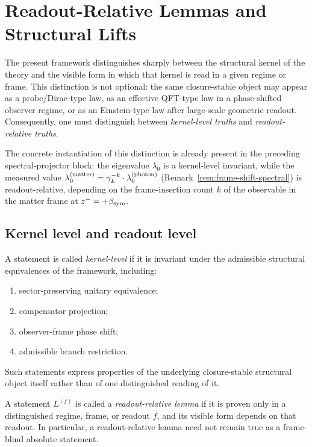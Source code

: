 \section{Readout-Relative Lemmas and Structural Lifts}
\label{sec:readout-relative-lemmas}

The present framework distinguishes sharply between the structural kernel
of the theory and the visible form in which that kernel is read in a
given regime or frame. This distinction is not optional: the same
closure-stable object may appear as a probe/Dirac-type law, as an
effective QFT-type law in a phase-shifted observer regime, or as an
Einstein-type law after large-scale geometric readout. Consequently,
one must distinguish between \emph{kernel-level truths} and
\emph{readout-relative truths}.

The concrete instantiation of this distinction is already present in the
preceding spectral-projector block: the eigenvalue $\lambda_0$ is a
kernel-level invariant, while the measured value
$\lambda_0^{(\mathrm{matter})} = \gamma_L^{-k}\cdot\lambda_0^{(\mathrm{photon})}$
(Remark~\ref{rem:frame-shift-spectral}) is readout-relative, depending
on the frame-insertion count $k$ of the observable in the matter frame
at $z^- = +\beta_{\mathrm{sym}}$.

\subsection*{Kernel level and readout level}

\begin{definition}
\label{def:kernel-level-statement}
A statement is called \emph{kernel-level} if it is invariant under the
admissible structural equivalences of the framework, including:
\begin{enumerate}[label=(\roman*)]
  \item sector-preserving unitary equivalence;
  \item compensator projection;
  \item observer-frame phase shift;
  \item admissible branch restriction.
\end{enumerate}
Such statements express properties of the underlying closure-stable
structural object itself rather than of one distinguished reading of it.
\end{definition}

\begin{definition}
\label{def:readout-relative-lemma}
A statement $L^{(f)}$ is called a \emph{readout-relative lemma} if it
is proven only in a distinguished regime, frame, or readout $f$, and its
visible form depends on that readout. In particular, a readout-relative
lemma need not remain true as a frame-blind absolute statement.
\end{definition}

